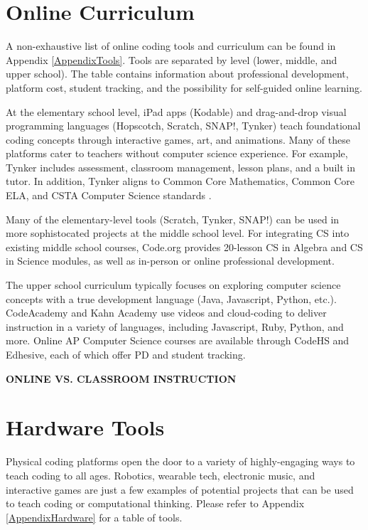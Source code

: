 \section{Online Curriculum}
A non-exhaustive list of online coding tools and curriculum can be found in Appendix \ref{AppendixTools}. Tools are separated by level (lower, middle, and upper school). The table contains information about professional development, platform cost, student tracking, and the possibility for self-guided online learning. \par 
At the elementary school level, iPad apps (Kodable) and drag-and-drop visual programming languages (Hopscotch, Scratch, SNAP!, Tynker) teach foundational coding concepts through interactive games, art, and animations. Many of these platforms cater to teachers without computer science experience. For example, Tynker includes assessment, classroom management, lesson plans, and a built in tutor. In addition, Tynker aligns to Common Core Mathematics, Common Core ELA, and CSTA Computer Science standards \cite{tynker}. \par
Many of the elementary-level tools (Scratch, Tynker, SNAP!) can be used in more sophistocated projects at the middle school level. For integrating CS into existing middle school courses, Code.org provides 20-lesson CS in Algebra and CS in Science modules, as well as in-person or online professional development. \par
The upper school curriculum typically focuses on exploring computer science concepts with a true development language (Java, Javascript, Python, etc.). CodeAcademy and Kahn Academy use videos and cloud-coding to deliver instruction in a variety of languages, including Javascript, Ruby, Python, and more. Online AP Computer Science courses are available through CodeHS and Edhesive, each of which offer PD and student tracking.  \par

\textbf{ONLINE VS. CLASSROOM INSTRUCTION} \\

\section{Hardware Tools}
Physical coding platforms open the door to a variety of highly-engaging ways to teach coding to all ages. Robotics, wearable tech, electronic music, and interactive games are just a few examples of potential projects that can be used to teach coding or computational thinking. Please refer to Appendix \ref{AppendixHardware} for a table of tools.